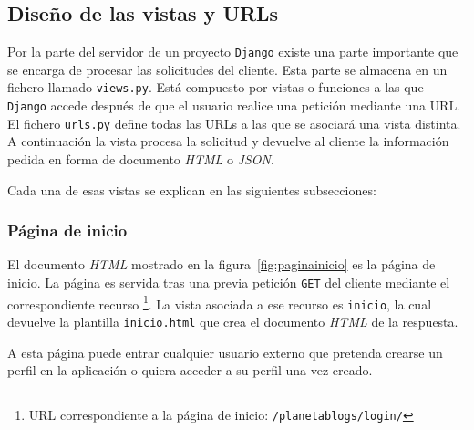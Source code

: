 \documentclass[a4paper, 12pt]{book}
\begin{document}
\subsection{Dise\~no de las vistas y URLs} 
\label{sec:vistasurls}
Por la parte del servidor de un proyecto \texttt{Django} existe una parte importante que se encarga de procesar las solicitudes del cliente. Esta parte se
almacena en un fichero llamado \texttt{views.py}. Est\'a compuesto por vistas o funciones a las que \texttt{Django} accede despu\'es de que el usuario 
realice una petici\'on mediante una URL. El fichero \texttt{urls.py} define todas las URLs a las que se asociar\'a una vista distinta. A continuaci\'on
la vista procesa la solicitud y devuelve al cliente la informaci\'on pedida en forma de documento \textit{HTML} o \textit{JSON}.

Cada una de esas vistas se explican en las siguientes subsecciones:

\subsubsection{P\'agina de inicio} 
\label{sec:paginainicio}
El documento \textit{HTML} mostrado en la figura~\ref{fig:paginainicio} es la p\'agina de inicio. La p\'agina es servida tras una previa petici\'on \texttt{GET} del cliente 
mediante el correspondiente recurso \footnote{URL correspondiente a la p\'agina de inicio: \texttt{/planetablogs/login/}}. La vista asociada a ese recurso 
es \texttt{inicio}, la cual devuelve la plantilla \texttt{inicio.html} que crea el documento \textit{HTML} de la respuesta.

A esta p\'agina puede entrar cualquier usuario externo que pretenda crearse un perfil en la aplicaci\'on o quiera acceder a su perfil una vez creado.
\end{document}
